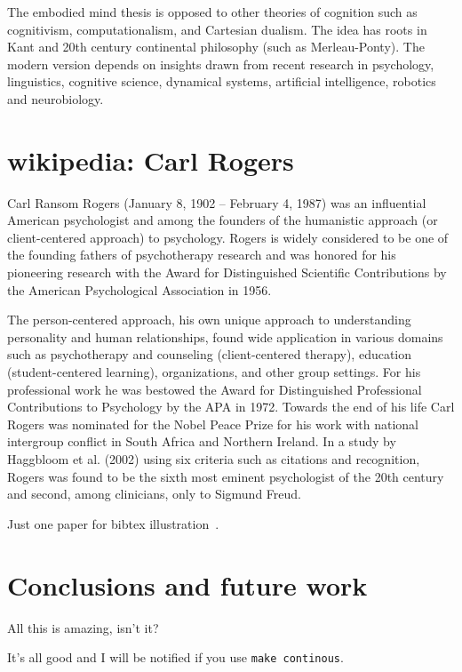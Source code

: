 The embodied mind thesis is opposed to other theories of cognition such as cognitivism, computationalism, and Cartesian dualism.
The idea has roots in Kant and 20th century continental philosophy (such as Merleau-Ponty).
The modern version depends on insights drawn from recent research in psychology, linguistics, cognitive science, dynamical systems, artificial intelligence, robotics and neurobiology.

\section{wikipedia: Carl Rogers}
Carl Ransom Rogers (January 8, 1902 -- February 4, 1987) was an influential American psychologist and among the founders of the humanistic approach (or client-centered approach) to psychology.
Rogers is widely considered to be one of the founding fathers of psychotherapy research and was honored for his pioneering research with the Award for Distinguished Scientific Contributions by the American Psychological Association in 1956.

The person-centered approach, his own unique approach to understanding personality and human relationships, found wide application in various domains such as psychotherapy and counseling (client-centered therapy), education (student-centered learning), organizations, and other group settings.
For his professional work he was bestowed the Award for Distinguished Professional Contributions to Psychology by the APA in 1972.
Towards the end of his life Carl Rogers was nominated for the Nobel Peace Prize for his work with national intergroup conflict in South Africa and Northern Ireland.
In a study by Haggbloom et al. (2002) using six criteria such as citations and recognition, Rogers was found to be the sixth most eminent psychologist of the 20th century and second, among clinicians, only to Sigmund Freud.


Just one paper for bibtex illustration~\cite{rogers1967person}.

\section{Conclusions and future work}
\label{sec:concl}
All this is amazing, isn't it?

It's all good and I will be notified if you use {\tt make continous}.


